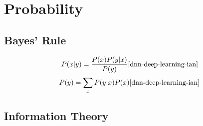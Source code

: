 \chapter{Probability}\label{chapter: probability}

\section{Bayes' Rule}\label{Bayes' Rule}

\[
    P(x|y) = \dfrac{P(x)P(y|x)}{P(y)}
    \hfill \text{\cite{dnn-deep-learning-ian}}
\]
\[
    P(y) = \dsum_x P(y|x)P(x)
    \hfill \text{\cite{dnn-deep-learning-ian}}
\]

\section{Information Theory}

